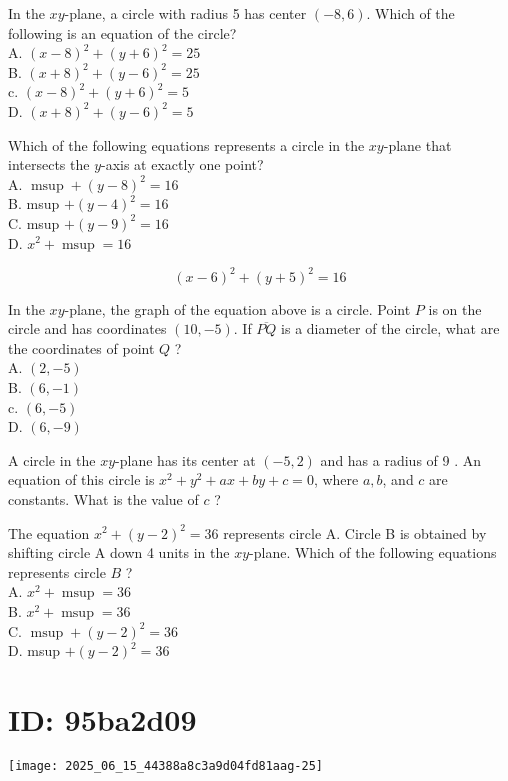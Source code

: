 In the $x y$-plane, a circle with radius 5 has center $(-8,6)$. Which of the following is an equation of the circle?\\
A. $(x-8)^{2}+(y+6)^{2}=25$\\
B. $(x+8)^{2}+(y-6)^{2}=25$\\
c. $(x-8)^{2}+(y+6)^{2}=5$\\
D. $(x+8)^{2}+(y-6)^{2}=5$

Which of the following equations represents a circle in the $x y$-plane that intersects the $y$-axis at exactly one point?\\
A. $\operatorname{msup}+(y-8)^{2}=16$\\
B. msup $+(y-4)^{2}=16$\\
C. msup $+(y-9)^{2}=16$\\
D. $x^{2}+\operatorname{msup}=16$

$$
(x-6)^{2}+(y+5)^{2}=16
$$

In the $x y$-plane, the graph of the equation above is a circle. Point $P$ is on the circle and has coordinates $(10,-5)$. If $\overline{P Q}$ is a diameter of the circle, what are the coordinates of point $Q$ ?\\
A. $(2,-5)$\\
B. $(6,-1)$\\
c. $(6,-5)$\\
D. $(6,-9)$

A circle in the $x y$-plane has its center at $(-5,2)$ and has a radius of 9 . An equation of this circle is $x^{2}+y^{2}+a x+b y+c=0$, where $a, b$, and $c$ are constants. What is the value of $c$ ?

The equation $x^{2}+(y-2)^{2}=36$ represents circle A. Circle B is obtained by shifting circle A down 4 units in the $x y$-plane. Which of the following equations represents circle $B$ ?\\
A. $x^{2}+\operatorname{msup}=36$\\
B. $x^{2}+\operatorname{msup}=36$\\
C. $\operatorname{msup}+(y-2)^{2}=36$\\
D. msup $+(y-2)^{2}=36$

\section*{ID: 95ba2d09}
\begin{center}
\texttt{[image: 2025\_06\_15\_44388a8c3a9d04fd81aag-25]}
\end{center}

